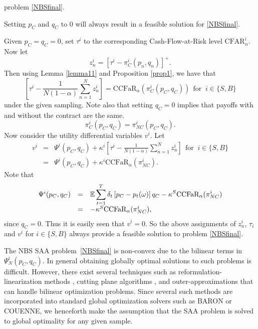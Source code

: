 problem \eqref{NBSfinal}.
\begin{lemma}
	Setting $p_C$ and $q_C$ to 0 will always result in a feasible solution for \eqref{NBSfinal}.
\end{lemma}
Given $p_C = q_C = 0$, set $\tau^i$ to the corresponding Cash-Flow-at-Risk level
$\text{CFAR}^i_{\alpha}$. Now let 
\begin{equation*}
	z_n^i = [\tau^i - \pi_C^i(p_n, q_n)]^+.
\end{equation*}
Then using Lemma \ref{lemma11} and Proposition \ref{prop1}, we have that
\begin{equation*}
	\left[ \tau^i - \frac{1}{N(1 - \alpha)} \displaystyle \sum_{n=1}^N z_n^i \right]
	= \text{CCFaR}_\alpha (\pi_C^i(p_C, q_C)) \ \ \text{for } \ i \in \{S,B\}
\end{equation*}
under the given sampling. Note also that setting $q_C = 0$ implies that payoffs
with and without the contract are the same.
\begin{equation*}
	\pi_C^i(p_C, q_C) = \pi_{NC}^i(p_C, q_C).
\end{equation*}
Now consider the utility differential variables $v^i$. Let
\begin{equation*}
	\begin{array}{ccl}
		v^i & = & \displaystyle \Psi^i(p_C, q_C) + \kappa^i \left[ \tau^i - \frac{1}{N(1
			- \alpha)} \displaystyle \sum_{n=1}^N z_n^i \right] \ \ \text{for } \ i \in \{S,B\} \\
		& = & \Psi^i(p_C, q_C) + \kappa^i \text{CCFaR}_\alpha (\pi_{NC}^i).
	\end{array}
\end{equation*}
Note that 
\begin{equation*}
	\begin{array}{ccl}
		\Psi^i(p_C, q_C)  & = & \mathbb{E} \displaystyle \sum_{t=1}^T \delta_t \left[p_C - p_t(\omega) \right]q_C - \kappa^S \text{CCFaR}_\alpha(\pi_{NC}^i) \\
		& = & - \kappa^S \text{CCFaR}_\alpha(\pi_{NC}^i),
	\end{array}
\end{equation*}
since $q_C = 0$.
Thus it is easily seen that $v^i = 0$. So the above assignments of $z^i_n$,
$\tau_i$ and $v^i$ for $i \in \{S,B\}$ always provide a feasible solution to
problem \eqref{NBSfinal}. 
\endproof

The NBS SAA problem~\eqref{NBSfinal} is non-convex due to the bilinear terms in
$\Psi^i_N(p_C,q_C)$. In general obtaining globally optimal solutions to such
problems is difficult. However, there exist several techniques such as
reformulation-linearization methods \citep{sherali1992new}, cutting plane
algorithms \citep{konno1976cutting}, and outer-approximations
\citep{Floudas1995} that can handle bilinear optimization
problems. Since several such methods are incorporated into standard global
optimization solvers such as BARON or COUENNE, we henceforth make the
assumption that the SAA problem is solved to global optimality for any given
sample.

